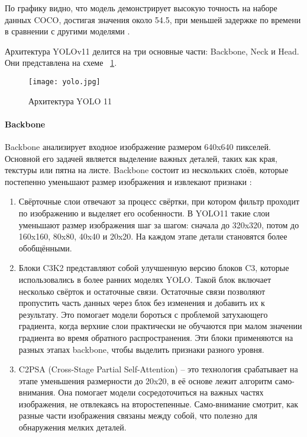 По графику видно, что модель демонстрирует высокую точность на наборе данных COCO, достигая значения около 54.5, при меньшей задержке по времени в сравнении с другими моделями \cite{yolo7}.

Архитектура YOLOv11 делится на три основные части: Backbone, Neck и Head. Они представлена на схеме ~\ref{йоло:image}.

\begin{figure}[H]
	\texttt{[image: yolo.jpg]}
	\caption{Архитектура YOLO 11}
	\label{йоло:image}
\end{figure}

\paragraph{Backbone}

Backbone анализирует входное изображение размером 640x640 пикселей. Основной его задачей является выделение важных деталей, таких как края, текстуры или пятна на листе. Backbone состоит из нескольких слоёв, которые постепенно уменьшают размер изображения и извлекают признаки \cite{yolo8}:

\begin{enumerate}
	\item Свёрточные слои отвечают за процесс свёртки, при котором фильтр проходит по изображению и выделяет его особенности. В YOLO11 такие слои уменьшают размер изображения шаг за шагом: сначала до 320x320, потом до 160x160, 80x80, 40x40 и 20x20. На каждом этапе детали становятся более обобщёнными.
	
	\item Блоки C3K2 представляют собой улучшенную версию блоков C3, которые использовались в более ранних моделях YOLO. Такой блок включает несколько свёрток и остаточные связи. Остаточные связи позволяют пропустить часть данных через блок без изменения и добавить их к результату. Это помогает модели бороться с проблемой затухающего градиента, когда верхние слои практически не обучаются при малом значении градиента во время обратного распространения. Эти блоки применяются на разных этапах backbone, чтобы выделить признаки разного уровня.
	
	\item C2PSA (Cross-Stage Partial Self-Attention) -- это технология срабатывает на этапе уменьшения размерности до 20x20, в её основе лежит алгоритм само-внимания. Она помогает модели сосредоточиться на важных частях изображения, не отвлекаясь на второстепенные. Само-внимание смотрит, как разные части изображения связаны между собой, что полезно для обнаружения мелких деталей.
\end{enumerate}

